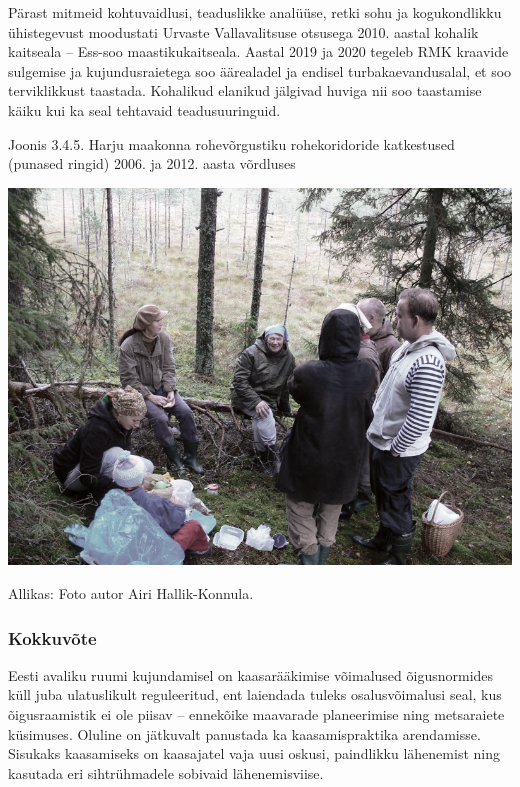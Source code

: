 \documentclass[estonian,]{article}
\begin{document}
Pärast mitmeid kohtuvaidlusi, teaduslikke analüüse, retki sohu ja kogukondlikku ühistegevust moodustati Urvaste Vallavalitsuse otsusega 2010. aastal kohalik kaitseala -- Ess-soo maastikukaitseala. Aastal 2019 ja 2020 tegeleb RMK kraavide sulgemise ja kujundusraietega soo äärealadel ja endisel turbakaevandusalal, et soo terviklikkust taastada. Kohalikud elanikud jälgivad huviga nii soo taastamise käiku kui ka seal tehtavaid teadusuuringuid.

{Joonis 3.4.5.} Harju maakonna rohevõrgustiku rohekoridoride katkestused (punased ringid) 2006. ja 2012. aasta võrdluses

\begin{center}\includegraphics[width=0.9\linewidth]{figures/3-chapter/fig345} \end{center}

\begin{imgsource}
{Allikas:} Foto autor Airi Hallik-Konnula.
\end{imgsource}

\hypertarget{kokkuvuxf5te-10}{%
\subsubsection*{Kokkuvõte}\label{kokkuvuxf5te-10}}

Eesti avaliku ruumi kujundamisel on kaasarääkimise võimalused õigusnormides küll juba ulatuslikult reguleeritud, ent laiendada tuleks osalusvõimalusi seal, kus õigusraamistik ei ole piisav -- ennekõike maavarade planeerimise ning metsaraiete küsimuses. Oluline on jätkuvalt panustada ka kaasamispraktika arendamisse. Sisukaks kaasamiseks on kaasajatel vaja uusi oskusi, paindlikku lähenemist ning kasutada eri sihtrühmadele sobivaid lähenemisviise.
\end{document}
